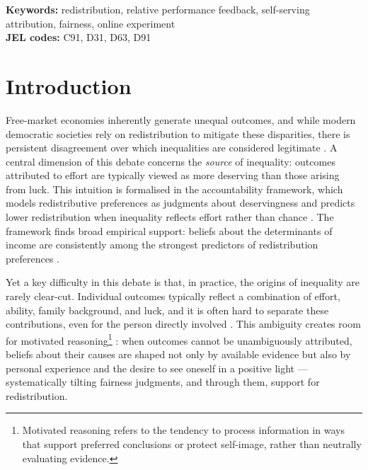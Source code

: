 \documentclass[12pt]{article}
\begin{document}
\bigskip
\noindent\textbf{Keywords:} redistribution, relative performance feedback,
self-serving attribution, fairness, online experiment\\
\noindent\textbf{JEL codes:} C91, D31, D63, D91

\newpage

\section{Introduction}

Free-market economies inherently generate unequal outcomes, and while modern
democratic societies rely on redistribution to mitigate these disparities,
there is persistent disagreement over which inequalities are considered
legitimate \citep{AlesinGiulian2011, Piketty2014}.
A central dimension of this debate concerns the \emph{source} of inequality:
outcomes attributed to effort are typically viewed as more deserving than those
arising from luck.
This intuition is formalised in the accountability framework, which models
redistributive preferences as judgments about deservingness and predicts lower
redistribution when inequality reflects effort rather than chance
\citep{Konow2000, Cappelen2007}.
The framework finds broad empirical support: beliefs about the determinants of
income are consistently among the strongest predictors of redistribution
preferences \citep{Piketty1995, Alesina2005, Benabou2006}.

Yet a key difficulty in this debate is that, in practice, the origins of
inequality are rarely clear-cut.
Individual outcomes typically reflect a combination of effort, ability,
family background, and luck, and it is often hard to separate these
contributions, even for the person directly involved \citep{Piketty2014}.
This ambiguity creates room for motivated reasoning\footnote{Motivated
reasoning refers to the tendency to process information in ways that support
preferred conclusions or protect self-image, rather than neutrally evaluating
evidence.} \citep{Kunda1990}: when outcomes cannot be unambiguously attributed,
beliefs about their causes are shaped not only by available evidence but also
by personal experience and the desire to see oneself in a positive light ---
systematically tilting fairness judgments, and through them, support for
redistribution.
\end{document}

